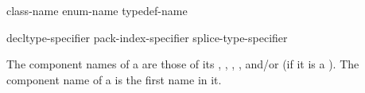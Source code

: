\begin{bnf}
\br
    class-name\br
    enum-name\br
    typedef-name
\end{bnf}

\begin{bnf}
\br
    decltype-specifier\br
    pack-index-specifier\br
    splice-type-specifier
\end{bnf}

\pnum
{}
The component names of a  are those of its
,
,
,
, and/or
(if it is a ).
The component name of a  is the first name in it.

